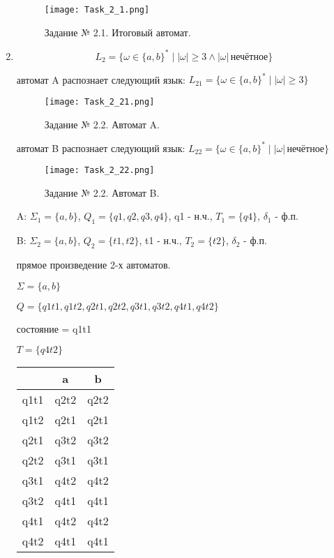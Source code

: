 \documentclass[a4paper, 12pt]{article}
\begin{document}
\begin{enumerate}
\begin{figure}[!h]
\centering
\texttt{[image: Task\_2\_1.png]}
\caption{Задание № 2.1. Итоговый автомат.}
\end{figure}

\item$$ L_2 = \{\omega \in \{a, b\}^* \mid |\omega| \geq 3 \wedge |\omega| \, \text{нечётное} \} $$

 автомат A распознает следующий язык: $ L_{21} = \{\omega \in \{a, b\}^* \mid |\omega| \geq 3 \} $

\begin{figure}[!h]
\centering
\texttt{[image: Task\_2\_21.png]}
\caption{Задание № 2.2. Автомат A.}
\end{figure}

 автомат B распознает следующий язык: $ L_{22} = \{\omega \in \{a, b\}^* \mid |\omega| \, \text{нечётное} \} $

\begin{figure}[!h]
\centering
\texttt{[image: Task\_2\_22.png]}
\caption{Задание № 2.2. Автомат B.}
\end{figure}

 A: $ \Sigma_1 = \{a, b\}$, $ Q_1 = \{q1, q2, q3, q4 \} $, q1 - н.ч., $ T_1 = \{q4 \} $, $ \delta_1 $ - ф.п.

 B: $ \Sigma_2 = \{a, b\}$, $ Q_2 = \{t1, t2\} $, t1 - н.ч., $ T_2 = \{t2 \} $, $ \delta_2 $ - ф.п.

 прямое произведение 2-х автоматов.

\noindent$ \Sigma = \{a, b\}$

\noindent$ Q = \{q1t1, q1t2, q2t1, q2t2, q3t1, q3t2, q4t1, q4t2 \} $

 состояние = q1t1

\noindent$ T = \{q4t2 \} $

\begin{center}
\begin{tabular}{ |c|c|c| } 
\hline
\, & a & b \\
\hline
 q1t1 & q2t2 & q2t2 \\
\hline
q1t2 & q2t1 & q2t1 \\
\hline
q2t1& q3t2 & q3t2 \\
\hline
q2t2 & q3t1 & q3t1 \\
\hline
q3t1 & q4t2 & q4t2 \\
\hline
q3t2 & q4t1 & q4t1 \\
\hline
q4t1 & q4t2 & q4t2 \\
\hline
q4t2 & q4t1 & q4t1 \\
\hline
\end{tabular}
\end{center}


\end{enumerate}
\end{document}
